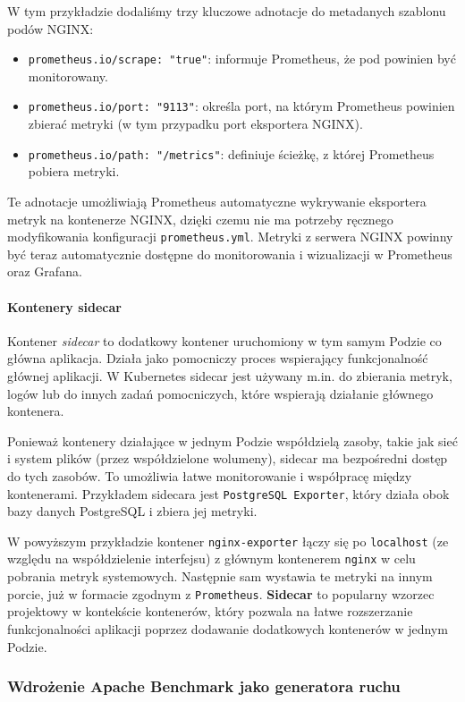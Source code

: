 \documentclass{article}
\begin{document}
W tym przykładzie dodaliśmy trzy kluczowe adnotacje do metadanych szablonu podów NGINX:
\begin{itemize}
\item \texttt{prometheus.io/scrape: "true"}: informuje Prometheus, że pod powinien być monitorowany.
\item \texttt{prometheus.io/port: "9113"}: określa port, na którym Prometheus powinien zbierać metryki (w tym przypadku port eksportera NGINX).
\item \texttt{prometheus.io/path: "/metrics"}: definiuje ścieżkę, z której Prometheus pobiera metryki.
\end{itemize}

Te adnotacje umożliwiają Prometheus automatyczne wykrywanie eksportera metryk na kontenerze NGINX, dzięki czemu nie ma potrzeby ręcznego modyfikowania konfiguracji \texttt{prometheus.yml}. Metryki z serwera NGINX powinny być teraz automatycznie dostępne do monitorowania i wizualizacji w Prometheus oraz Grafana.

\paragraph{Kontenery sidecar}

Kontener \textit{sidecar} to dodatkowy kontener uruchomiony w tym samym Podzie co główna aplikacja. Działa jako pomocniczy proces wspierający funkcjonalność głównej aplikacji. W Kubernetes sidecar jest używany m.in. do zbierania metryk, logów lub do innych zadań pomocniczych, które wspierają działanie głównego kontenera.

Ponieważ kontenery działające w jednym Podzie współdzielą zasoby, takie jak sieć i system plików (przez współdzielone wolumeny), sidecar ma bezpośredni dostęp do tych zasobów. To umożliwia łatwe monitorowanie i współpracę między kontenerami. Przykładem sidecara jest \texttt{PostgreSQL Exporter}, który działa obok bazy danych PostgreSQL i zbiera jej metryki.

W powyższym przykładzie kontener \texttt{nginx-exporter} łączy się po \texttt{localhost} (ze względu na współdzielenie interfejsu) z głównym kontenerem \texttt{nginx} w celu pobrania metryk systemowych. Następnie sam wystawia te metryki na innym porcie, już w formacie zgodnym z \texttt{Prometheus}. \textbf{Sidecar} to popularny wzorzec projektowy w kontekście kontenerów, który pozwala na łatwe rozszerzanie funkcjonalności aplikacji poprzez dodawanie dodatkowych kontenerów w jednym Podzie.

\subsubsection{Wdrożenie Apache Benchmark jako generatora ruchu}
\end{document}
